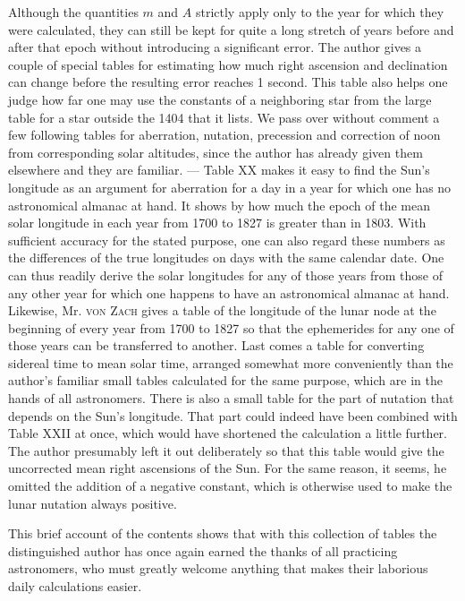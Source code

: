 Although the quantities $m$ and $A$ strictly apply only to the year for which they were calculated, they can still be kept for quite a long stretch of years before and after that epoch without introducing a significant error. The author gives a couple of special tables for estimating how much right ascension and declination can change before the resulting error reaches 1 second. This table also helps one judge how far one may use the constants of a neighboring star from the large table for a star outside the 1404 that it lists. We pass over without comment a few following tables for aberration, nutation, precession and correction of noon from corresponding solar altitudes, since the author has already given them elsewhere and they are familiar. --- Table XX makes it easy to find the Sun's longitude as an argument for aberration for a day in a year for which one has no astronomical almanac at hand. It shows by how much the epoch of the mean solar longitude in each year from 1700 to 1827 is greater than in 1803. With sufficient accuracy for the stated purpose, one can also regard these numbers as the differences of the true longitudes on days with the same calendar date. One can thus readily derive the solar longitudes for any of those years from those of any other year for which one happens to have an astronomical almanac at hand. Likewise, Mr. \textsc{von Zach} gives a table of the longitude of the lunar node at the beginning of every year from 1700 to 1827 so that the ephemerides for any one of those years can be transferred to another. Last comes a table for converting sidereal time to mean solar time, arranged somewhat more conveniently than the author's familiar small tables calculated for the same purpose, which are in the hands of all astronomers. There is also a small table for the part of nutation that depends on the Sun's longitude. That part could indeed have been combined with Table XXII at once, which would have shortened the calculation a little further. The author presumably left it out deliberately so that this table would give the uncorrected mean right ascensions of the Sun. For the same reason, it seems, he omitted the addition of a negative constant, which is otherwise used to make the lunar nutation always positive.

This brief account of the contents shows that with this collection of tables the distinguished author has once again earned the thanks of all practicing astronomers, who must greatly welcome anything that makes their laborious daily calculations easier.
